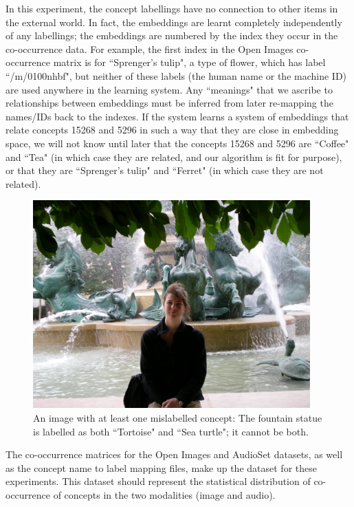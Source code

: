 In this experiment, the concept labellings have no connection to other items in the external world. In fact, the embeddings are learnt completely independently of any labellings; the embeddings are numbered by the index they occur in the co-occurrence data. For example, the first index in the Open Images co-occurrence matrix is for ``Sprenger's tulip", a type of flower, which has label ``/m/0100nhbf", but neither of these labels (the human name or the machine ID) are used anywhere in the learning system. Any ``meanings" that we ascribe to relationships between embeddings must be inferred from later re-mapping the names/IDs back to the indexes. If the system learns a system of embeddings that relate concepts 15268 and 5296 in such a way that they are close in embedding space, we will not know until later that the concepts 15268 and 5296 are ``Coffee" and ``Tea" (in which case they are related, and our algorithm is fit for purpose), or that they are ``Sprenger's tulip" and ``Ferret" (in which case they are not related). 

\begin{figure}[H]
    \centering
    \includegraphics[width=0.95\textwidth]{images/method/tortoise_seaturtle.jpg}
    \caption{
        An image with at least one mislabelled concept: The fountain statue is labelled as both ``Tortoise" and ``Sea turtle"; it cannot be both. 
    }
\end{figure}


The co-occurrence matrices for the Open Images and AudioSet datasets, as well as the concept name to label mapping files, make up the dataset for these experiments. This dataset should represent the statistical distribution of co-occurrence of concepts in the two modalities (image and audio). \\

